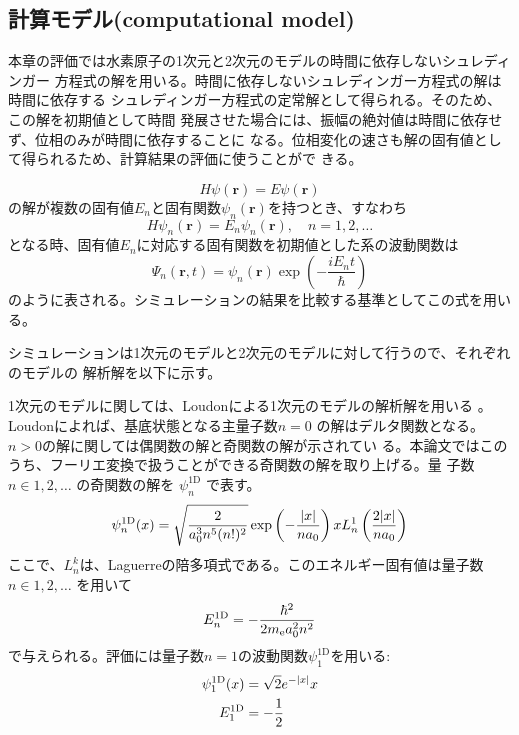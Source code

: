 \documentclass[fontsize=11pt]{jlreq}
\begin{document}
\clearpage
\subsection{計算モデル(computational model)}
本章の評価では水素原子の1次元と2次元のモデルの時間に依存しないシュレディンガー
方程式の解を用いる。時間に依存しないシュレディンガー方程式の解は時間に依存する
シュレディンガー方程式の定常解として得られる。そのため、この解を初期値として時間
発展させた場合には、振幅の絶対値は時間に依存せず、位相のみが時間に依存することに
なる。位相変化の速さも解の固有値として得られるため、計算結果の評価に使うことがで
きる。

\begin{equation}
H\psi(\bm{r})=E\psi(\bm{r})
\end{equation}
の解が複数の固有値$E_n$と固有関数$\psi_n(\bm{r})$を持つとき、すなわち
\begin{equation}
H\psi_n(\bm{r})=E_n\psi_n(\bm{r}),\quad n=1,2,\ldots
\end{equation}
となる時、固有値$E_n$に対応する固有関数を初期値とした系の波動関数は
\begin{equation}
\Psi_n(\bm{r},t)=\psi_n(\bm{r})\exp\left(-\frac{iE_nt}{\hbar}\right)
\end{equation}
のように表される。シミュレーションの結果を比較する基準としてこの式を用いる。

シミュレーションは1次元のモデルと2次元のモデルに対して行うので、それぞれのモデルの
解析解を以下に示す。

1次元のモデルに関しては、Loudonによる1次元のモデルの解析解を用いる
\cite{Loudon1959.10.1119/1.1934950}。Loudonによれば、基底状態となる主量子数$n=0$
の解はデルタ関数となる。$n>0$の解に関しては偶関数の解と奇関数の解が示されてい
る。本論文ではこのうち、フーリエ変換で扱うことができる奇関数の解を取り上げる。量
子数 $n\in{1,2,\ldots}$ の奇関数の解を $\psi_n^{\mathrm{1D}}$ で表す。
\begin{equation}
\psi_n^{\mathrm{1D}}(x)=\sqrt{\frac{2}{a_0^3n^5(n!)^2}}
\exp\left(-\frac{{\left| x \right|}}{na_0}\right)xL_n^1\left(\frac{2{\left| x \right|}}{na_0}\right)
\end{equation}
ここで、$L_n^k$は、Laguerreの陪多項式である。このエネルギー固有値は量子数
$n\in{1,2,\ldots}$ を用いて
\begin{equation}
    E_n^{\mathrm{1D}}=-\frac{\hbar^2}{2m_{\mathrm{e}} a_0^2 n^2}
\end{equation}
で与えられる。評価には量子数$n=1$の波動関数$\psi_1^{\mathrm{1D}}$を用いる:
\begin{align}
\psi_1^{\mathrm{1D}}(x)&=\sqrt{2}e^{-{\left| x \right|}} x
\label{eq:psi1D1-wave-function}\\
E_1^{\mathrm{1D}}&=-\frac{1}{2}
\label{eq:psi1D1-energy}
\end{align}
\end{document}
